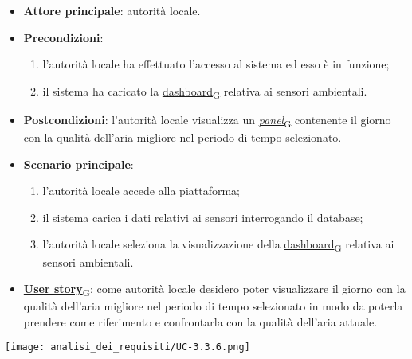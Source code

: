 \newpage
{}
\begin{itemize}
	\item \textbf{Attore principale}: autorità locale.
	\item \textbf{Precondizioni}:
	      \begin{enumerate}
		      \item l'autorità locale ha effettuato l'accesso al sistema ed esso è in funzione;
		      \item il sistema ha caricato la \href{https://7last.github.io/docs/pb/documentazione-interna/glossario\#dashboard}{dashboard\textsubscript{G}} relativa ai sensori ambientali.
	      \end{enumerate}
	\item \textbf{Postcondizioni}: l'autorità locale visualizza un \href{https://7last.github.io/docs/pb/documentazione-interna/glossario\#panel}{\textit{panel}\textsubscript{G}} contenente il giorno con la qualità dell'aria migliore nel periodo di tempo selezionato.
	\item \textbf{Scenario principale}:
	      \begin{enumerate}
		      \item l'autorità locale accede alla piattaforma;
		      \item il sistema carica i dati relativi ai sensori interrogando il database;
		      \item l'autorità locale seleziona la visualizzazione della \href{https://7last.github.io/docs/pb/documentazione-interna/glossario\#dashboard}{dashboard\textsubscript{G}} relativa ai sensori ambientali.
	      \end{enumerate}
	\item \href{https://7last.github.io/docs/pb/documentazione-interna/glossario\#user-story}{\textbf{User story}\textsubscript{G}}:
	      come autorità locale desidero poter visualizzare il giorno con la qualità dell'aria migliore nel periodo di tempo selezionato
	      in modo da poterla prendere come riferimento e confrontarla con la qualità dell'aria attuale.
\end{itemize}
\begin{center}
	\texttt{[image: analisi\_dei\_requisiti/UC-3.3.6.png]}
\end{center}


